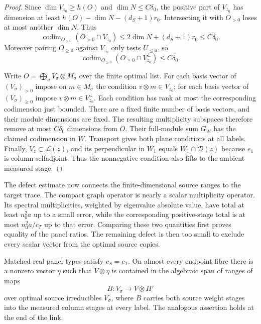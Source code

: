 \begin{proof}
Since $\dim V_{z_0}\geq h(O)$ and $\dim N\leq C\delta_0$, the
positive part of $V_{z_0}$ has dimension at least
$h(O)-\dim N-(d_S+1)r_0$.  Intersecting it with $O_{>0}$ loses at most
another $\dim N$.  Thus
\[
 \operatorname{codim}_{O_{>0}}(O_{>0}\cap V_{z_0})
 \leq2\dim N+(d_S+1)r_0\leq C\delta_0.
\]
Moreover pairing $O_{\geq0}$ against $V_{z_0}$ only tests $U_{\leq0}$,
so
\[
 \operatorname{codim}_{O_{\geq0}}
        (O_{\geq0}\cap V_{z_0}^{\perp})\leq C\delta_0.
\]

Write $O=\bigoplus_\sigma V_\sigma\otimes M_\sigma$ over the finite
optimal list.  For each basis vector of $(V_\sigma)_{>0}$ impose on
$m\in M_\sigma$ the condition $v\otimes m\in V_{z_0}$; for each
basis vector of $(V_\sigma)_{\geq0}$ impose
$v\otimes m\in V_{z_0}^{\perp}$.  Each condition has rank at most the
corresponding codimension just bounded.  There are a fixed finite number
of basis vectors, and their module dimensions are fixed.  The resulting
multiplicity subspaces therefore remove at most $C\delta_0$ dimensions
from $O$.  Their full-module sum $G_W$ has the claimed codimension in
$W$.  Transport gives both plane conditions at all labels.  Finally,
$V_z\subset\mathcal L(z)$, and its perpendicular in $W_1$ equals
$W_1\cap\mathcal D(z)$ because $e_1$ is column-selfadjoint.  Thus the
nonnegative condition also lifts to the ambient measured stage.
\end{proof}

The defect estimate now connects the finite-dimensional source ranges to
the target trace.  The compact graph operator is nearly a scalar
multiplicity operator.  Its spectral multiplicities, weighted by eigenvalue
absolute value, have total at least $n_0^2a$ up to a small error, while the
corresponding positive-stage total is at most $n_0^2a/c_T$ up to that error.  Comparing these two quantities first proves equality of the panel
ratios.  The remaining defect is then too small to exclude every scalar
vector from the optimal source copies.

\begin{lemma}\label{lem:panels-scalar-witness}
Matched real panel types satisfy $c_S=c_T$.  On almost every endpoint
fibre there is a nonzero vector $\eta$ such that
$V\otimes\eta$ is contained in the algebraic span of ranges of maps
\[
 B:V_\sigma\longrightarrow V\otimes H'
\]
over optimal source irreducibles $V_\sigma$, where $B$ carries both
source weight stages into the measured column stages at every label.
The analogous assertion holds at the end of the link.
\end{lemma}


